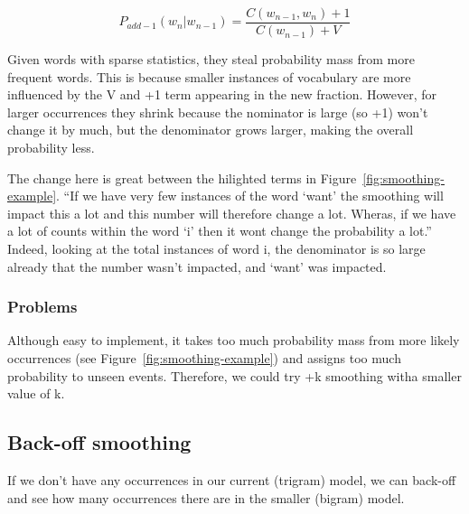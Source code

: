 \documentclass[11pt]{article}
\begin{document}
\begin{equation*}
    P_{add-1}(w_n|w_{n-1})=\frac{C(w_{n-1},w_n)+1}{C(w_{n-1})+V}
\end{equation*}

Given words with sparse statistics, they steal probability mass from more frequent words. This is because smaller instances of vocabulary are more influenced by the V and +1 term appearing in the new fraction. However, for larger occurrences they shrink because the nominator is large (so +1) won't change it by much, but the denominator grows larger, making the overall probability less.

The change here is great between the hilighted terms in Figure~\ref{fig:smoothing-example}. ``If we have very few instances of the word `want' the smoothing will impact this a lot and this number will therefore change a lot. Wheras, if we have a lot of counts within the word `i' then it wont change the probability a lot.'' Indeed, looking at the total instances of word i, the denominator is so large already that the number wasn't impacted, and `want' was impacted.

\subsubsection{Problems}

Although easy to implement, it takes too much probability mass from more likely occurrences (see Figure~\ref{fig:smoothing-example}) and assigns too much probability to unseen events. Therefore, we could try +k smoothing witha  smaller value of k.

\subsection{Back-off smoothing}

If we don't have any occurrences in our current (trigram) model, we can back-off and see how many occurrences there are in the smaller (bigram) model.
\end{document}
